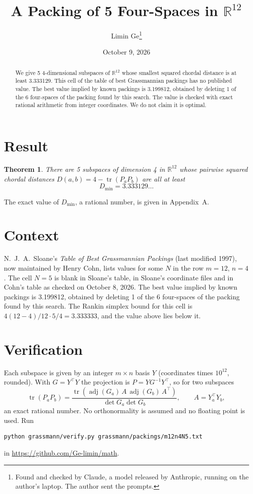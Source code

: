 \documentclass[11pt,a4paper]{article}
\title{A Packing of 5 Four-Spaces in $\mathbb{R}^{12}$}
\author{Limin Ge\thanks{Found and checked by Claude, a model released by Anthropic, running on the author's laptop. The author sent the prompts.}}
\date{October 9, 2026}
\newtheorem*{theorem}{Theorem}
\begin{document}
\maketitle
\begin{abstract}
We give 5 4-dimensional subspaces of $\mathbb{R}^{12}$ whose smallest squared chordal distance is at least 3.333129. This cell of the table of best Grassmannian packings has no published value. The best value implied by known packings is 3.199812, obtained by deleting 1 of the 6 four-spaces of the packing found by this search. The value is checked with exact rational arithmetic from integer coordinates. We do not claim it is optimal.
\end{abstract}

\section{Result}
\begin{theorem}
There are 5 subspaces of dimension 4 in $\mathbb{R}^{12}$ whose pairwise squared chordal distances $D(a,b) = 4 - \operatorname{tr}(P_aP_b)$ are all at least
\[ D_{\min} = 3.333129\ldots \]
\end{theorem}
The exact value of $D_{\min}$, a rational number, is given in Appendix~A.


\section{Context}
N.~J.~A.~Sloane's \emph{Table of Best Grassmannian Packings} (last modified 1997), now maintained by Henry Cohn, lists values for some $N$ in the row $m=12$, $n=4$. The cell $N=5$ is blank in Sloane's table, in Sloane's coordinate files and in Cohn's table as checked on October 8, 2026. The best value implied by known packings is 3.199812, obtained by deleting 1 of the 6 four-spaces of the packing found by this search. The Rankin simplex bound for this cell is $4(12-4)/12\cdot 5/4 = 3.333333$, and the value above lies below it.


\section{Verification}
Each subspace is given by an integer $m\times n$ basis $Y$ (coordinates times $10^{12}$, rounded). With $G=Y^\top Y$ the projection is $P=YG^{-1}Y^\top$, so for two subspaces
\[ \operatorname{tr}(P_aP_b)=\frac{\operatorname{tr}(\operatorname{adj}(G_a)\,A\,\operatorname{adj}(G_b)\,A^\top)}{\det G_a\det G_b},\qquad A=Y_a^\top Y_b, \]
an exact rational number. No orthonormality is assumed and no floating point is used. Run
\begin{verbatim}
python grassmann/verify.py grassmann/packings/m12n4N5.txt
\end{verbatim}
in \url{https://github.com/Ge-limin/math}.
\end{document}
